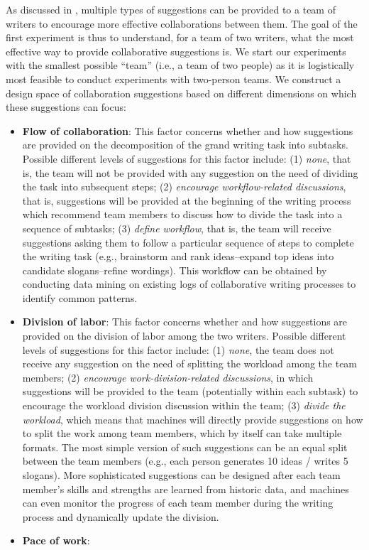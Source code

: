 As discussed in , multiple types of suggestions can be provided to a team of writers to encourage more effective collaborations between them. The goal of the first experiment is thus to understand, for a team of two writers, what the most effective way to provide collaborative suggestions is. We start our experiments with the smallest possible ``team'' (i.e., a team of two people) as it is logistically most feasible to conduct experiments with two-person teams. We construct a design space of collaboration suggestions based on different dimensions on which these suggestions can focus:
\begin{itemize}
\item {\bf Flow of collaboration}: This factor concerns whether and how suggestions are provided on the decomposition of the grand writing task into subtasks. Possible different levels of suggestions for this factor include: (1) {\em none}, that is, the team will not be provided with any suggestion on the need of dividing the task into subsequent steps; (2) {\em encourage workflow-related discussions}, that is, suggestions will be provided at the beginning of the writing process which recommend team members to discuss how to divide the task into a sequence of subtasks; (3) {\em define workflow}, that is, the team will receive suggestions asking them to follow a particular sequence of steps to complete the writing task (e.g., brainstorm and rank ideas--expand top ideas into candidate slogans--refine wordings). This workflow can be obtained by conducting data mining on existing logs of collaborative writing processes to identify common patterns.  
\item {\bf Division of labor}: This factor concerns whether and how suggestions are provided on the division of labor among the two writers. Possible different levels of suggestions for this factor include: (1) {\em none}, the team does not receive any suggestion on the need of splitting the workload among the team members; (2) {\em encourage work-division-related discussions}, in which suggestions will be provided to the team (potentially within each subtask) to encourage the workload division discussion within the team; (3) {\em divide the workload}, which means that machines will directly provide suggestions on how to split the work among team members, which by itself can take multiple formats. The most simple version of such suggestions can be an equal split between the team members (e.g., each person generates 10 ideas / writes 5 slogans). More sophisticated suggestions can be designed after each team member's skills and strengths are learned from historic data, and machines can even monitor the progress of each team member during the writing process and dynamically update the division.
\item {\bf Pace of work}:
\end{itemize}

